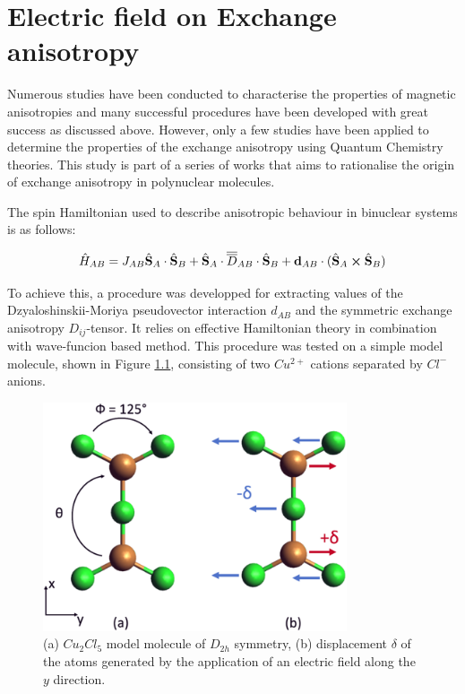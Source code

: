 \documentclass[12pt]{report}
\numberwithin{equation}{section}
\begin{document}
\chapter{Electric field on Exchange anisotropy}\label{chap:Cu2Cl5}

Numerous studies have been conducted to characterise the properties of magnetic anisotropies and many successful procedures have been developed with great success as discussed above. 
However, only a few studies have been applied to determine the properties of the exchange anisotropy using Quantum Chemistry theories.
This study is part of a series of works that aims to rationalise the origin of exchange anisotropy in polynuclear molecules.
\par The spin Hamiltonian used to describe anisotropic behaviour in binuclear systems is as follows:

\begin{equation}
    \hat{H}_{AB}=J_{AB}\hat{\vb S}_A \cdot \hat{\vb S}_B + \hat{\vb S}_A \cdot\overline{\overline{D}}_{AB} \cdot \hat{\vb S}_B + \vb{d}_{AB} \cdot (\hat{\vb S}_A \cross \hat{\vb S}_B)
\end{equation}

To achieve this, a procedure was developped for extracting values of the Dzyaloshinskii-Moriya pseudovector interaction $d_{AB}$ and the symmetric exchange anisotropy $D_{ij}$-tensor. 
It relies on effective Hamiltonian theory in combination with wave-funcion based method.
This procedure was tested on a simple model molecule, shown in Figure \ref{MolCu2Cl5}, consisting of two $Cu^{2+}$ cations separated by $Cl^-$ anions.
\begin{figure}[!ht]
    \centering
    \includegraphics[width=0.8\textwidth]{Images/Cu2Cl5.png}
    \caption{(a) $Cu_2Cl_5$ model molecule of $D_{2h}$ symmetry, (b) displacement $\delta$ of the atoms generated by the application of an electric field along the $y$ direction.}
    \label{MolCu2Cl5}
\end{figure}
\end{document}
